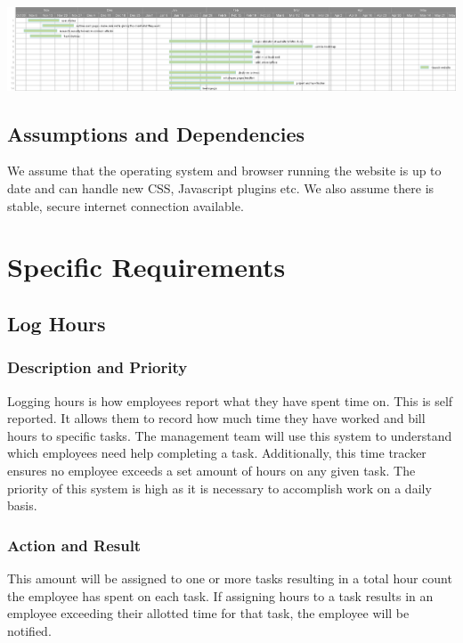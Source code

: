 \documentclass[letterpaper,10pt,titlepage,journal,compsoc,draftclsnofoot,onecolumn]{IEEEtran}
\begin{document}
\includegraphics[scale=0.25]{RequirementsDocument}

\subsection{Assumptions and Dependencies}

We assume that the operating system and browser running the website is up to date and can handle new CSS, Javascript plugins etc. We also assume there is stable, secure internet connection available.

\section{Specific Requirements}

\subsection{Log Hours}

\subsubsection{Description and Priority}

Logging hours is how employees report what they have spent time on. This is self reported. It allows them to record how much time they have worked and bill hours to specific tasks. The management team will use this system to understand which employees need help completing a task. Additionally, this time tracker ensures no employee exceeds a set amount of hours on any given task. The priority of this system is high as it is necessary to accomplish work on a daily basis.

\subsubsection{Action and Result}

This amount will be assigned to one or more tasks resulting in a total hour count the employee has spent on each task. If assigning hours to a task results in an employee exceeding their allotted time for that task, the employee will be notified.
\end{document}
